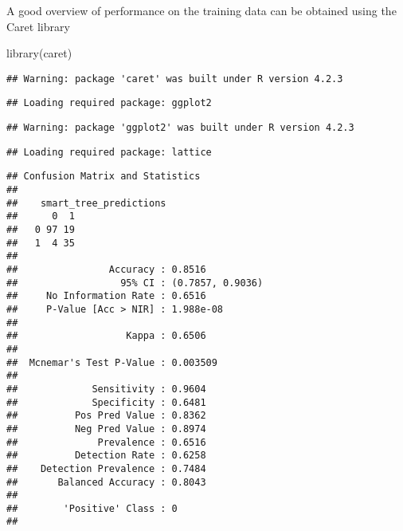 \documentclass[
]{article}
\newenvironment{Shaded}{\begin{snugshade}}{\end{snugshade}}
\newcommand{\AttributeTok}[1]{\textcolor[rgb]{0.77,0.63,0.00}{#1}}
\newcommand{\FunctionTok}[1]{\textcolor[rgb]{0.00,0.00,0.00}{#1}}
\newcommand{\NormalTok}[1]{#1}
\newcommand{\OtherTok}[1]{\textcolor[rgb]{0.56,0.35,0.01}{#1}}
\newcommand{\SpecialCharTok}[1]{\textcolor[rgb]{0.00,0.00,0.00}{#1}}
\newcommand{\StringTok}[1]{\textcolor[rgb]{0.31,0.60,0.02}{#1}}
\begin{document}
A good overview of performance on the training data can be obtained
using the Caret library

\begin{Shaded}
\begin{Highlighting}[]
\FunctionTok{library}\NormalTok{(}\StringTok{\textquotesingle{}caret\textquotesingle{}}\NormalTok{)}
\end{Highlighting}
\end{Shaded}

\begin{verbatim}
## Warning: package 'caret' was built under R version 4.2.3
\end{verbatim}

\begin{verbatim}
## Loading required package: ggplot2
\end{verbatim}

\begin{verbatim}
## Warning: package 'ggplot2' was built under R version 4.2.3
\end{verbatim}

\begin{verbatim}
## Loading required package: lattice
\end{verbatim}

\begin{Shaded}
\end{Shaded}

\begin{verbatim}
## Confusion Matrix and Statistics
## 
##    smart_tree_predictions
##      0  1
##   0 97 19
##   1  4 35
##                                           
##                Accuracy : 0.8516          
##                  95% CI : (0.7857, 0.9036)
##     No Information Rate : 0.6516          
##     P-Value [Acc > NIR] : 1.988e-08       
##                                           
##                   Kappa : 0.6506          
##                                           
##  Mcnemar's Test P-Value : 0.003509        
##                                           
##             Sensitivity : 0.9604          
##             Specificity : 0.6481          
##          Pos Pred Value : 0.8362          
##          Neg Pred Value : 0.8974          
##              Prevalence : 0.6516          
##          Detection Rate : 0.6258          
##    Detection Prevalence : 0.7484          
##       Balanced Accuracy : 0.8043          
##                                           
##        'Positive' Class : 0               
## 
\end{verbatim}
\end{document}

